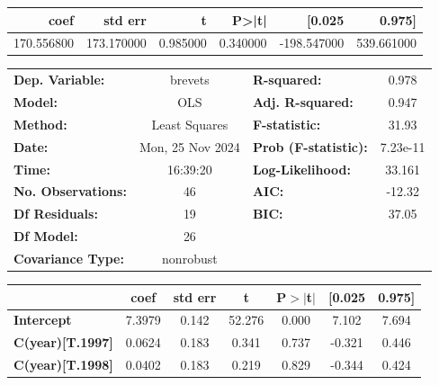 \begin{tabular}{rrrrrr}
\toprule
coef & std err & t & P>|t| & [0.025 & 0.975] \\
\midrule
170.556800 & 173.170000 & 0.985000 & 0.340000 & -198.547000 & 539.661000 \\
\bottomrule
\end{tabular}


\begin{center}
\begin{tabular}{lclc}
\toprule
\textbf{Dep. Variable:}      &     brevets      & \textbf{  R-squared:         } &     0.978   \\
\textbf{Model:}              &       OLS        & \textbf{  Adj. R-squared:    } &     0.947   \\
\textbf{Method:}             &  Least Squares   & \textbf{  F-statistic:       } &     31.93   \\
\textbf{Date:}               & Mon, 25 Nov 2024 & \textbf{  Prob (F-statistic):} &  7.23e-11   \\
\textbf{Time:}               &     16:39:20     & \textbf{  Log-Likelihood:    } &    33.161   \\
\textbf{No. Observations:}   &          46      & \textbf{  AIC:               } &    -12.32   \\
\textbf{Df Residuals:}       &          19      & \textbf{  BIC:               } &     37.05   \\
\textbf{Df Model:}           &          26      & \textbf{                     } &             \\
\textbf{Covariance Type:}    &    nonrobust     & \textbf{                     } &             \\
\bottomrule
\end{tabular}
\begin{tabular}{lcccccc}
                             & \textbf{coef} & \textbf{std err} & \textbf{t} & \textbf{P$> |$t$|$} & \textbf{[0.025} & \textbf{0.975]}  \\
\midrule
\textbf{Intercept}           &       7.3979  &        0.142     &    52.276  &         0.000        &        7.102    &        7.694     \\
\textbf{C(year)[T.1997]}     &       0.0624  &        0.183     &     0.341  &         0.737        &       -0.321    &        0.446     \\
\textbf{C(year)[T.1998]}     &       0.0402  &        0.183     &     0.219  &         0.829        &       -0.344    &        0.424     \\

\end{tabular}
\end{center}
